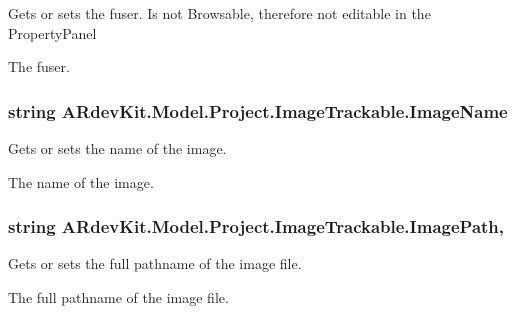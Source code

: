 Gets or sets the fuser. Is not Browsable, therefore not editable in the Property\-Panel 

The fuser. \hypertarget{class_a_rdev_kit_1_1_model_1_1_project_1_1_image_trackable_ade2bba8d745b4c9f758bb22f7e82a946}{
\subsubsection[{Image\-Name}]{\setlength{\rightskip}{0pt plus 5cm}string A\-Rdev\-Kit.\-Model.\-Project.\-Image\-Trackable.\-Image\-Name\hspace{0.3cm}{\ttfamily [get]}}}\label{class_a_rdev_kit_1_1_model_1_1_project_1_1_image_trackable_ade2bba8d745b4c9f758bb22f7e82a946}


Gets or sets the name of the image. 

The name of the image. \hypertarget{class_a_rdev_kit_1_1_model_1_1_project_1_1_image_trackable_abf66216adfd7fcd5f94a6bdf55f30a36}{
\subsubsection[{Image\-Path}]{\setlength{\rightskip}{0pt plus 5cm}string A\-Rdev\-Kit.\-Model.\-Project.\-Image\-Trackable.\-Image\-Path\hspace{0.3cm}{\ttfamily [get]}, {\ttfamily [set]}}}\label{class_a_rdev_kit_1_1_model_1_1_project_1_1_image_trackable_abf66216adfd7fcd5f94a6bdf55f30a36}


Gets or sets the full pathname of the image file. 

The full pathname of the image file. 